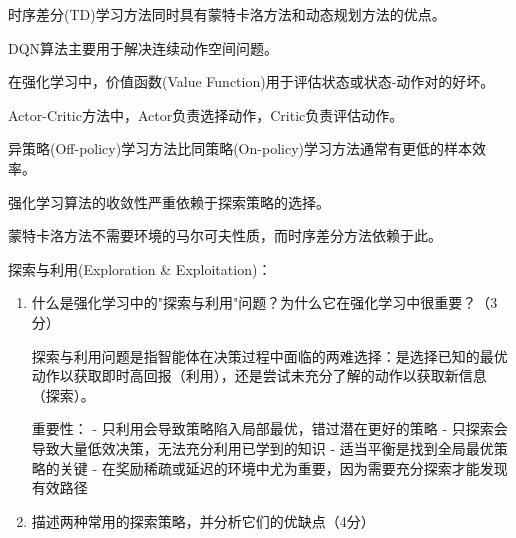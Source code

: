 \documentclass[zihao=5,answers]{BHCexam}
\begin{document}
\begin{questions}
\question 时序差分(TD)学习方法同时具有蒙特卡洛方法和动态规划方法的优点。

\question DQN算法主要用于解决连续动作空间问题。

\question 在强化学习中，价值函数(Value Function)用于评估状态或状态-动作对的好坏。

\question Actor-Critic方法中，Actor负责选择动作，Critic负责评估动作。

\question 异策略(Off-policy)学习方法比同策略(On-policy)学习方法通常有更低的样本效率。

\question 强化学习算法的收敛性严重依赖于探索策略的选择。

\question 蒙特卡洛方法不需要环境的马尔可夫性质，而时序差分方法依赖于此。

\jianda

\question[10] 探索与利用(Exploration & Exploitation)：
\begin{solution}
\begin{enumerate}
    \item 什么是强化学习中的"探索与利用"问题？为什么它在强化学习中很重要？（3分）
    
    探索与利用问题是指智能体在决策过程中面临的两难选择：是选择已知的最优动作以获取即时高回报（利用），还是尝试未充分了解的动作以获取新信息（探索）。
    
    重要性：
    - 只利用会导致策略陷入局部最优，错过潜在更好的策略
    - 只探索会导致大量低效决策，无法充分利用已学到的知识
    - 适当平衡是找到全局最优策略的关键
    - 在奖励稀疏或延迟的环境中尤为重要，因为需要充分探索才能发现有效路径
    
    \item 描述两种常用的探索策略，并分析它们的优缺点（4分）
    

\end{enumerate}
\end{solution}
\end{questions}
\end{document}
